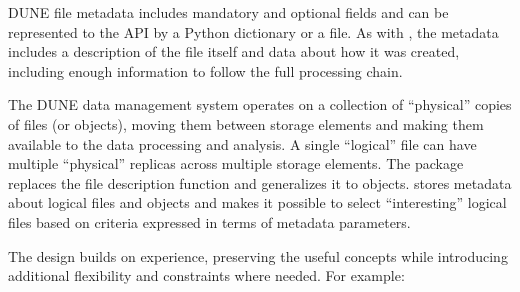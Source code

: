 \documentclass[../main-v1.tex]{subfiles}
\begin{document}
DUNE file metadata includes mandatory and optional fields and can be represented to the API by a Python dictionary or a  file. 
As with , the metadata includes a description of the file itself and data about how it was created, including enough information to follow the full processing chain.   



 
The DUNE data  management system operates on a collection of ``physical'' copies of files (or objects), moving them between storage elements and making them available to the data processing and analysis. 
A single  ``logical'' file can have multiple ``physical'' replicas across multiple storage elements. The  package replaces the  file description function and generalizes it to objects.  
 stores metadata about logical files and objects and makes it possible to select ``interesting'' logical files based on criteria expressed in terms of metadata parameters. 

The  design builds on  experience, preserving the useful concepts while introducing additional flexibility and constraints where needed.   For example:
\end{document}
